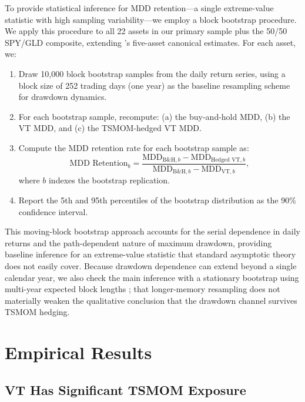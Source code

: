 To provide statistical inference for MDD retention---a single extreme-value statistic with high sampling variability---we employ a block bootstrap procedure. We apply this procedure to all 22 assets in our primary sample plus the 50/50 SPY/GLD composite, extending 's five-asset canonical estimates. For each asset, we:

\begin{enumerate}
\item Draw 10,000 block bootstrap samples from the daily return series, using a block size of 252 trading days (one year) as the baseline resampling scheme for drawdown dynamics.
\item For each bootstrap sample, recompute: (a) the buy-and-hold MDD, (b) the VT MDD, and (c) the TSMOM-hedged VT MDD.
\item Compute the MDD retention rate for each bootstrap sample as:
\begin{equation}
\text{MDD Retention}_b = \frac{\text{MDD}_{\text{B\&H},b} - \text{MDD}_{\text{Hedged VT},b}}{\text{MDD}_{\text{B\&H},b} - \text{MDD}_{\text{VT},b}},
\label{eq:mdd_retention_boot}
\end{equation}
where $b$ indexes the bootstrap replication.
\item Report the 5th and 95th percentiles of the bootstrap distribution as the 90\% confidence interval.
\end{enumerate}

This moving-block bootstrap approach accounts for the serial dependence in daily returns and the path-dependent nature of maximum drawdown, providing baseline inference for an extreme-value statistic that standard asymptotic theory does not easily cover. Because drawdown dependence can extend beyond a single calendar year, we also check the main inference with a stationary bootstrap using multi-year expected block lengths ; that longer-memory resampling does not materially weaken the qualitative conclusion that the drawdown channel survives TSMOM hedging.


\section{Empirical Results}

\subsection{VT Has Significant TSMOM Exposure}

